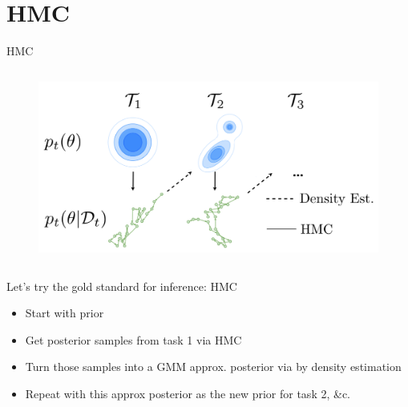 \documentclass[12pt,aspectratio=169, handout]{beamer}
\let\olditem\item
\renewcommand\item{\olditem\justifying}
\begin{document}
\section{HMC}
\begin{frame}{HMC}
\begin{column}{0.4\textwidth}
    \begin{figure}
		\centering
		\includegraphics[width=\textwidth]{"images/Fig2_pic.png"}
	\end{figure}
\end{column}
\begin{column}{0.6\textwidth}
    Let's try the gold standard for inference: HMC
    \begin{itemize}[<+->]
        \item Start with prior
        \item Get posterior samples from task 1 via HMC
        \item Turn those samples into a GMM approx. posterior via by density estimation
        \item Repeat with this approx posterior as the new prior for task 2, \&c.
    \end{itemize}
\end{column}

\end{frame}
\end{document}
